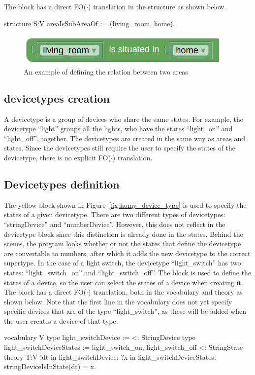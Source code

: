 \documentclass[11pt,a4paper]{report}
\newcommand{\fodot}{FO($\cdot$)\xspace}
\begin{document}
The block has a direct \fodot translation in the structure as shown below. 
\begin{idplisting}
structure S:V {
    areaIsSubAreaOf := {(living_room, home)}.
}
\end{idplisting}

\begin{figure}
    \centering
    \includegraphics[width=0.4\linewidth]{images/homy_area_relation.png}
    \caption{An example of defining the relation between two areas}
    \label{fig:homy_area_relation}
\end{figure}

\subsection{devicetypes creation}
A devicetype is a group of devices who share the same states. For example, the devicetype ``light'' groups all the lights, who have the states ``light\_on'' and ``light\_off'', together. The devicetypes are created in the same way as areas and states. Since the devicetypes still require the user to specify the states of the devicetype, there is no explicit \fodot translation.

\subsection{Devicetypes definition}
The yellow block shown in Figure~\ref{fig:homy_device_type} is used to specify the states of a given devicetype. There are two different types of devicetypes: ``stringDevice'' and ``numberDevice''. However, this does not reflect in the devicetype block since this distinction is already done in the states. Behind the scenes, the program looks whether or not the states that define the devicetype are convertable to numbers, after which it adds the new devicetype to the correct supertype. In the case of a light switch, the devicetype ``light\_switch'' has two states: ``light\_switch\_on'' and ``light\_switch\_off''. The block is used to define the states of a device, so the user can select the states of a device when creating it. The block has a direct \fodot translation, both in the vocabulary and theory as shown below. Note that the first line in the vocabulary does not yet specify specific devices that are of the type ``light\_switch'', as these will be added when the user creates a device of that type.
\begin{idplisting}
vocabulary V {
    type light_switchDevice := {} <: StringDevice
    type light_switchDeviceStates := {light_switch_on,
    light_switch_off} <: StringState
}
theory T:V {
    !dt in light_switchDevice: ?x in light_switchDeviceStates: stringDeviceIsInState(dt) = x.
}
\end{idplisting}
\end{document}
